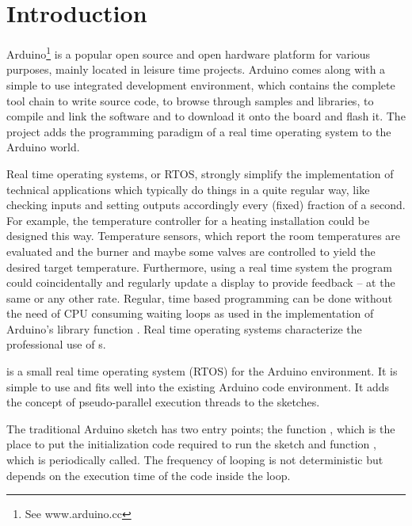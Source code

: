 \chapter{Introduction}
\label{secInrto}

Arduino\footnote{See www.arduino.cc} is a popular open source and open
hardware \uC{} platform for various purposes, mainly located in leisure
time projects. Arduino comes along with a simple to use integrated
development en\-vi\-ron\-ment, which contains the complete tool chain to
write source code, to browse through samples and libraries, to compile and
link the software and to download it onto the board and flash it. The
\rtos{} project adds the programming paradigm of a real time operating
system to the Arduino world.

Real time operating systems, or RTOS, strongly simplify the implementation
of technical applications which typically do things in a quite regular
way, like checking inputs and setting outputs accordingly every (fixed)
fraction of a second. For example, the temperature controller for a
heating installation could be designed this way. Temperature sensors,
which report the room temperatures are evaluated and the burner and maybe
some valves are controlled to yield the desired target temperature.
Furthermore, using a real time system the program could coincidentally and
regularly update a display to provide feedback -- at the same or any other
rate. Regular, time based programming can be done without the need of CPU
consuming waiting loops as used in the implementation of Arduino's library
function . Real time operating systems characterize the
professional use of \uC{}s.

\rtos{} is a small real time operating system (RTOS) for the Arduino
environment. It is simple to use and fits well into the existing Arduino
code environment. It adds the concept of pseudo-parallel execution threads
to the sketches.

The traditional Arduino sketch has two entry points; the function
, which is the place to put the initialization code required
to run the sketch and function , which is periodically
called. The frequency of looping is not deterministic but depends on
the execution time of the code inside the loop.

